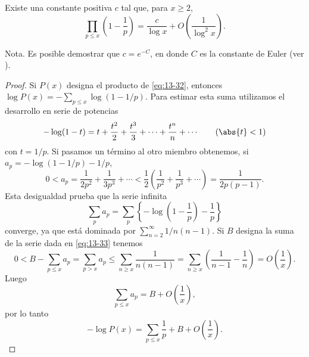 \documentclass[12pt,a4paper]{book}
\begin{document}
    \begin{teorema}\label{teo:13-13}
        Existe una constante positiva $c$ tal que, para $x\geq2$,
        \begin{equation}\label{eq:13-32}
            \prod_{p\leq x}\left(1-\frac{1}{p}\right)=\frac{c}{\log x}+O\left(\frac{1}{\log^{2}x}\right).
        \end{equation}
    \end{teorema}

    Nota. Es posible demostrar que $c=e^{-C}$, en donde $C$ es la constante de Euler (ver
    \cite{hardywright1960}).

    \begin{proof}
        Si $P(x)$ designa el producto de \eqref{eq:13-32}, entonces
        $\log P(x)=-\sum_{p\leq x}\log(1-1/p)$. Para estimar esta suma utilizamos el desarrollo
        en serie de potencias
        \begin{equation*}
            -\log(1-t)=t+\frac{t^{2}}{2}+\frac{t^{3}}{3}+\cdots+\frac{t^{n}}{n}+\cdots\qquad(\abs{t}<1)
        \end{equation*}
        con $t=1/p$. Si pasamos un término al otro miembro obtenemos, si
        $a_{p}=-\log(1-1/p)-1/p$,
        \begin{equation*}
            0<a_{p}=\frac{1}{2p^{2}}+\frac{1}{3p^{3}}+\cdots<\frac{1}{2}\left(\frac{1}{p^{2}}+\frac{1}{p^{3}}+\cdots\right)=\frac{1}{2p(p-1)}.
        \end{equation*}
        Esta desigualdad prueba que la serie infinita
        \begin{equation}\label{eq:13-33}
            \sum_{p}a_{p}=\sum_{p}\left\{-\log\left(1-\frac{1}{p}\right)-\frac{1}{p}\right\}
        \end{equation}
        converge, ya que está dominada por $\sum_{n=2}^{\infty}1/n(n-1)$. Si $B$ designa la suma
        de la serie dada en \eqref{eq:13-33} tenemos
        \begin{equation*}
            0<B-\sum_{p\leq x}a_{p}=\sum_{p>x}a_{p}\leq\sum_{n\geq x}\frac{1}{n(n-1)}=\sum_{n\geq x}\left(\frac{1}{n-1}-\frac{1}{n}\right)=O\left(\frac{1}{x}\right).
        \end{equation*}
        Luego
        \begin{equation*}
            \sum_{p\leq x}a_{p}=B+O\left(\frac{1}{x}\right),
        \end{equation*}
        por lo tanto
        \begin{equation*}
            -\log P(x)=\sum_{p\leq x}\frac{1}{p}+B+O\left(\frac{1}{x}\right).

\end{equation*}
\end{proof}
\end{document}
